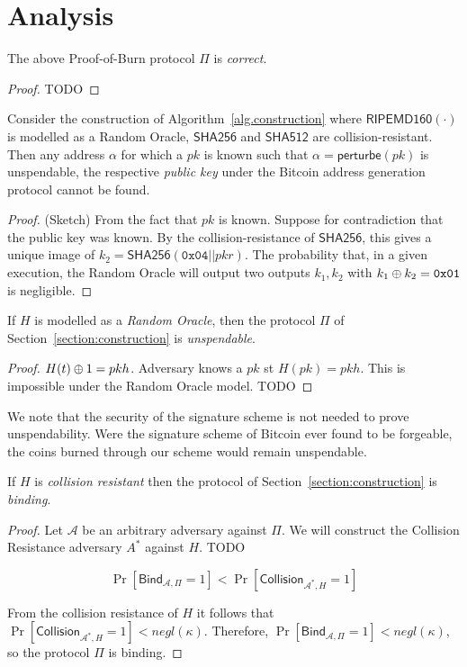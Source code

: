 \section{Analysis}

\begin{theorem}[Correctness]
  The above Proof-of-Burn protocol $\Pi$ is \emph{correct}.
\end{theorem}
\begin{proof}
  TODO
\end{proof}

\begin{lemma}[Unspendability]
  Consider the construction of Algorithm~\ref{alg.construction} where
  $\textsf{RIPEMD160}(\cdot)$ is modelled as a Random Oracle, $\textsf{SHA256}$
  and $\textsf{SHA512}$  are collision-resistant. Then any address $\alpha$ for
  which a $pk$ is known such that $\alpha = \textsf{perturbe}(pk)$ is
  unspendable, the respective \emph{public key} under the Bitcoin address
  generation protocol cannot be found.
\end{lemma}
\begin{proof}(Sketch)
  From the fact that $pk$ is known.
  Suppose for contradiction that the public key was known.
  By the collision-resistance of $\textsf{SHA256}$, this gives a unique image of
  $k_2 = \textsf{SHA256}(\texttt{0x04} || pkr)$.
  The probability that, in a given execution, the Random Oracle will output two
  outputs $k_1, k_2$ with $k_1 \oplus k_2 = \texttt{0x01}$ is negligible.
\end{proof}


\begin{theorem}
  If $H$ is modelled as a \emph{Random Oracle}, then the protocol $\Pi$ of Section~\ref{section:construction} is \emph{unspendable}.
\end{theorem}
\begin{proof}
  $H(t) \oplus 1 = pkh$.
  Adversary knows a $pk$ st $H(pk) = pkh$.
  This is impossible under the Random Oracle model.
  TODO
\end{proof}

We note that the security of the signature scheme is not needed to prove unspendability. Were the signature scheme of Bitcoin ever found to be forgeable, the coins burned through our scheme would remain unspendable.

\begin{theorem}
  If $H$ is \emph{collision resistant} then the protocol of Section~\ref{section:construction} is \emph{binding}.
\end{theorem}
\begin{proof}
  Let $\mathcal{A}$ be an arbitrary adversary against $\Pi$.
  We will construct the Collision Resistance adversary $A^*$ against $H$.
  TODO

  \[
    \Pr[\textsf{Bind}_{\mathcal{A},\Pi} = 1]
    <
    \Pr[\textsf{Collision}_{\mathcal{A}^*,H} = 1]
  \]

  From the collision resistance of $H$ it follows that $\Pr[\textsf{Collision}_{\mathcal{A}^*,H} = 1] < negl(\kappa)$. Therefore,
  $\Pr[\textsf{Bind}_{\mathcal{A},\Pi} = 1] < negl(\kappa)$, so
  the protocol $\Pi$ is binding.
\end{proof}

